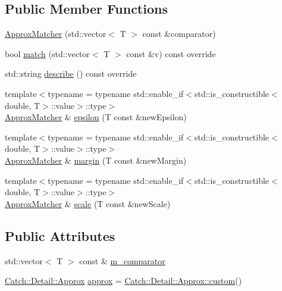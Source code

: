 \subsection*{Public Member Functions}
\begin{DoxyCompactItemize}
\item 
\mbox{\hyperlink{struct_catch_1_1_matchers_1_1_vector_1_1_approx_matcher_a55e8f7018104e0730eef656a61646870}{Approx\+Matcher}} (std\+::vector$<$ T $>$ const \&comparator)
\item 
bool \mbox{\hyperlink{struct_catch_1_1_matchers_1_1_vector_1_1_approx_matcher_a9cbd62093c4c123f1984726e1a14b270}{match}} (std\+::vector$<$ T $>$ const \&v) const override
\item 
std\+::string \mbox{\hyperlink{struct_catch_1_1_matchers_1_1_vector_1_1_approx_matcher_a1a9237e24c513c1448fa0624b3e14232}{describe}} () const override
\item 
{\footnotesize template$<$typename  = typename std\+::enable\+\_\+if$<$std\+::is\+\_\+constructible$<$double, T$>$\+::value$>$\+::type$>$ }\\\mbox{\hyperlink{struct_catch_1_1_matchers_1_1_vector_1_1_approx_matcher}{Approx\+Matcher}} \& \mbox{\hyperlink{struct_catch_1_1_matchers_1_1_vector_1_1_approx_matcher_a319b3a7fa9d0f401bfda5b45dafbbf5a}{epsilon}} (T const \&new\+Epsilon)
\item 
{\footnotesize template$<$typename  = typename std\+::enable\+\_\+if$<$std\+::is\+\_\+constructible$<$double, T$>$\+::value$>$\+::type$>$ }\\\mbox{\hyperlink{struct_catch_1_1_matchers_1_1_vector_1_1_approx_matcher}{Approx\+Matcher}} \& \mbox{\hyperlink{struct_catch_1_1_matchers_1_1_vector_1_1_approx_matcher_ac3b3afb3e5a9ad9ee0516e0202e08959}{margin}} (T const \&new\+Margin)
\item 
{\footnotesize template$<$typename  = typename std\+::enable\+\_\+if$<$std\+::is\+\_\+constructible$<$double, T$>$\+::value$>$\+::type$>$ }\\\mbox{\hyperlink{struct_catch_1_1_matchers_1_1_vector_1_1_approx_matcher}{Approx\+Matcher}} \& \mbox{\hyperlink{struct_catch_1_1_matchers_1_1_vector_1_1_approx_matcher_a8658dc0564e0f80f101e4574830a3b18}{scale}} (T const \&new\+Scale)
\end{DoxyCompactItemize}
\subsection*{Public Attributes}
\begin{DoxyCompactItemize}
\item 
std\+::vector$<$ T $>$ const  \& \mbox{\hyperlink{struct_catch_1_1_matchers_1_1_vector_1_1_approx_matcher_a1394b5913d30bdd1147e1941fc41af56}{m\+\_\+comparator}}
\item 
\mbox{\hyperlink{class_catch_1_1_detail_1_1_approx}{Catch\+::\+Detail\+::\+Approx}} \mbox{\hyperlink{struct_catch_1_1_matchers_1_1_vector_1_1_approx_matcher_a5515447af58adb5dc48a5d300b9ae162}{approx}} = \mbox{\hyperlink{class_catch_1_1_detail_1_1_approx_aaf86dc0ee92272ac2d9839197a07951d}{Catch\+::\+Detail\+::\+Approx\+::custom}}()
\end{DoxyCompactItemize}
